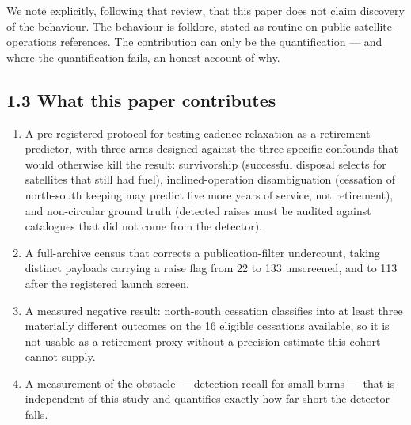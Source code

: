 \documentclass[11pt]{article}
\begin{document}

We note explicitly, following that review, that this paper does not claim discovery of the behaviour. The behaviour is folklore, stated as routine on public satellite-operations references. The contribution can only be the quantification --- and where the quantification fails, an honest account of why.

\subsection*{1.3 What this paper contributes}

\begin{enumerate}
\item[1.] A pre-registered protocol for testing cadence relaxation as a retirement predictor, with three arms designed against the three specific confounds that would otherwise kill the result: survivorship (successful disposal selects for satellites that still had fuel), inclined-operation disambiguation (cessation of north-south keeping may predict five more years of service, not retirement), and non-circular ground truth (detected raises must be audited against catalogues that did not come from the detector).
\item[2.] A full-archive census that corrects a publication-filter undercount, taking distinct payloads carrying a raise flag from 22 to 133 unscreened, and to 113 after the registered launch screen.
\item[3.] A measured negative result: north-south cessation classifies into at least three materially different outcomes on the 16 eligible cessations available, so it is not usable as a retirement proxy without a precision estimate this cohort cannot supply.
\item[4.] A measurement of the obstacle --- detection recall for small burns --- that is independent of this study and quantifies exactly how far short the detector falls.
\end{enumerate}
\end{document}
